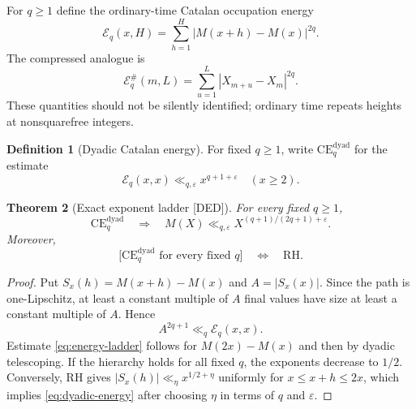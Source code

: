 \documentclass[11pt]{amsart}
\numberwithin{equation}{section}
\theoremstyle{plain}
\newtheorem{theorem}{Theorem}[section]
\theoremstyle{definition}
\newtheorem{definition}[theorem]{Definition}
\theoremstyle{remark}
\newcommand{\Mert}{M}
\newcommand{\eps}{\varepsilon}
\newcommand{\DED}{\textup{[DED]}}
\begin{document}
For $q\ge1$ define the ordinary-time Catalan occupation energy
\begin{equation}
\mathcal E_q(x,H)
=
\sum_{h=1}^{H}|\Mert(x+h)-\Mert(x)|^{2q}.
\label{eq:occupation-energy}
\end{equation}
The compressed analogue is
\begin{equation}
\mathcal E_q^{\#}(m,L)
=
\sum_{u=1}^{L}|X_{m+u}-X_m|^{2q}.
\label{eq:compressed-energy}
\end{equation}
These quantities should not be silently identified; ordinary time repeats heights at nonsquarefree
integers.

\begin{definition}[Dyadic Catalan energy]
\label{def:dyadic-energy}
For fixed $q\ge1$, write $\mathrm{CE}^{\mathrm{dyad}}_q$ for the estimate
\begin{equation}
\mathcal E_q(x,x)\ll_{q,\eps}x^{q+1+\eps}
\quad(x\ge2).
\label{eq:dyadic-energy}
\end{equation}
\end{definition}

\begin{theorem}[Exact exponent ladder \DED]
\label{thm:energy-ladder}
For every fixed $q\ge1$,
\begin{equation}
\mathrm{CE}^{\mathrm{dyad}}_q
\quad\Longrightarrow\quad
\Mert(X)\ll_{q,\eps}X^{(q+1)/(2q+1)+\eps}.
\label{eq:energy-ladder}
\end{equation}
Moreover,
\begin{equation}
\bigl[\mathrm{CE}^{\mathrm{dyad}}_q\text{ for every fixed }q\bigr]
\quad\Longleftrightarrow\quad
\mathrm{RH}.
\label{eq:all-q-rh}
\end{equation}
\end{theorem}

\begin{proof}
Put $S_x(h)=\Mert(x+h)-\Mert(x)$ and $A=|S_x(x)|$.  Since the path is
one-Lipschitz, at least a constant multiple of $A$ final values have size at least a
constant multiple of $A$.  Hence
\begin{equation}
A^{2q+1}\ll_q\mathcal E_q(x,x).
\label{eq:plateau-energy}
\end{equation}
Estimate \eqref{eq:energy-ladder} follows for $\Mert(2x)-\Mert(x)$ and then by dyadic
telescoping.  If the hierarchy holds for all fixed $q$, the exponents decrease to
$1/2$.  Conversely, RH gives $|S_x(h)|\ll_\eta x^{1/2+\eta}$ uniformly for
$x\le x+h\le2x$, which implies \eqref{eq:dyadic-energy} after choosing $\eta$ in
terms of $q$ and $\eps$.
\end{proof}
\end{document}
